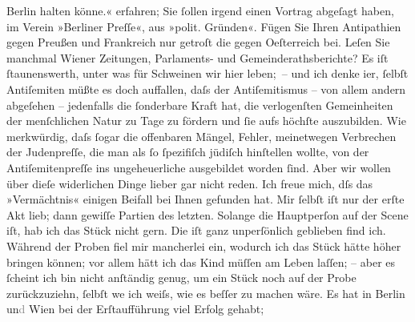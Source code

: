\begin{ledgroupsized}[t]{13cm}
{{{                                Berlin halten
                        könne.«}}}\label{K_L00880_2h} erfahren; Sie ſollen irgend einen Vortrag abgeſagt
                    haben, im Verein »Berliner Preſſe«, aus »polit.
                    Gründen«. Fügen Sie Ihren Antipathien gegen Preußen und Frankreich nur getroſt \introOben{}die\introOben{} gegen Oeſterreich bei. Leſen Sie manchmal Wiener Zeitungen, Parlaments- und
                    Gemeinderathsberichte? Es iſt ſtaunenswerth, unter was für Schweinen wir hier
                    leben; – und {\pb}ich denke i{\geminationm}er, ſelbſt Antiſemiten müßte es doch auffallen,
                    daſs der Antiſemitismus – von allem andern abgeſehen – jedenfalls die ſonderbare
                    Kraft hat, die verlogenſten Gemeinheiten der menſchlichen Natur zu Tage zu
                    fördern und ſie aufs höchſte auszubilden. Wie merkwürdig, daſs ſogar die
                    offenbaren Mängel, Fehler, meinetwegen Verbrechen der Judenpreſſe, die man als
                    ſo ſpezifiſch jüdiſch hinſtellen wollte, von der Antiſemiten{\pb}preſſe ins ungeheuerliche ausgebildet worden
                    ſind. Aber wir wollen über dieſe widerlichen Dinge lieber gar nicht reden.\pend
           \pstart
           Ich freue mich, dſs das »Vermächtnis« einigen
                    Beifall bei Ihnen gefunden hat. Mir ſelbſt iſt nur der erſte Akt lieb; dann
                    gewiſſe Partien des letzten. Solange die Hauptperſon auf der Scene iſt, hab ich
                    das Stück nicht gern. Die iſt ganz unperſönlich geblieben find ich. Während der
                    Proben fiel mir mancherlei ein, wodurch ich das Stück hätte höher bringen
                    können; vor allem hätt ich das Kind {\pb}müſſen
                    am Leben laſſen; – aber es ſcheint ich bin nicht anſtändig genug, um ein Stück
                    noch auf der Probe zurückzuziehn, ſelbſt we{\geminationn} ich
                    weiſs, wie es beſſer zu machen wäre. Es hat in Berlin un\textcolor{gray}{d}{ }Wien bei der Erſtaufführung viel Erfolg gehabt;

\end{ledgroupsized}
